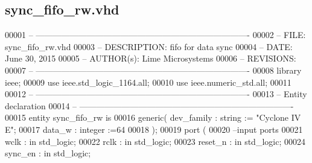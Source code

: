 \subsection{sync\+\_\+fifo\+\_\+rw.\+vhd}
\label{tx__packets_2sync__fifo__rw_8vhd_source}

\begin{DoxyCode}
00001 \textcolor{keyword}{-- ---------------------------------------------------------------------------- }
00002 \textcolor{keyword}{-- FILE:    sync\_fifo\_rw.vhd}
00003 \textcolor{keyword}{-- DESCRIPTION: fifo for data sync}
00004 \textcolor{keyword}{-- DATE:    June 30, 2015}
00005 \textcolor{keyword}{-- AUTHOR(s):   Lime Microsystems}
00006 \textcolor{keyword}{-- REVISIONS:}
00007 \textcolor{keyword}{-- ---------------------------------------------------------------------------- }
00008 \textcolor{vhdlkeyword}{library }\textcolor{keywordflow}{ieee};
00009 \textcolor{vhdlkeyword}{use }ieee.std\_logic\_1164.\textcolor{keywordflow}{all};
00010 \textcolor{vhdlkeyword}{use }ieee.numeric\_std.\textcolor{keywordflow}{all};
00011 
00012 \textcolor{keyword}{-- ----------------------------------------------------------------------------}
00013 \textcolor{keyword}{-- Entity declaration}
00014 \textcolor{keyword}{-- ----------------------------------------------------------------------------}
00015 \textcolor{keywordflow}{entity }sync_fifo_rw \textcolor{keywordflow}{is}
00016   \textcolor{keywordflow}{generic}\textcolor{vhdlchar}{(} \textcolor{vhdlchar}{dev_family}   \textcolor{vhdlchar}{:} \textcolor{comment}{string}  \textcolor{vhdlchar}{:=} \textcolor{keyword}{"Cyclone IV E"};
00017               \textcolor{vhdlchar}{data_w}        \textcolor{vhdlchar}{:} \textcolor{comment}{integer} \textcolor{vhdlchar}{:=}\textcolor{vhdllogic}{}\textcolor{vhdllogic}{64}
00018   \textcolor{vhdlchar}{)};
00019   \textcolor{keywordflow}{port} \textcolor{vhdlchar}{(}
00020 \textcolor{keyword}{        --input ports }
00021         \textcolor{vhdlchar}{wclk}      \textcolor{vhdlchar}{:} \textcolor{keywordflow}{in} \textcolor{comment}{std\_logic};
00022         \textcolor{vhdlchar}{rclk}      \textcolor{vhdlchar}{:} \textcolor{keywordflow}{in} \textcolor{comment}{std\_logic};
00023         \textcolor{vhdlchar}{reset_n}   \textcolor{vhdlchar}{:} \textcolor{keywordflow}{in} \textcolor{comment}{std\_logic};
00024         \textcolor{vhdlchar}{sync_en}   \textcolor{vhdlchar}{:} \textcolor{keywordflow}{in} \textcolor{comment}{std\_logic};

\end{DoxyCode}
